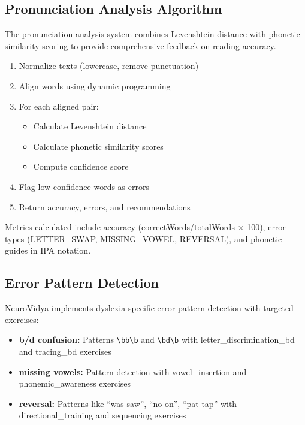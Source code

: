 \documentclass[journal]{IEEEtran}
\begin{document}
\subsection{Pronunciation Analysis Algorithm}

The pronunciation analysis system combines Levenshtein distance with phonetic similarity scoring to provide comprehensive feedback on reading accuracy.

\begin{enumerate}
    \item Normalize texts (lowercase, remove punctuation)
    \item Align words using dynamic programming
    \item For each aligned pair:
    \begin{itemize}
        \item Calculate Levenshtein distance
        \item Calculate phonetic similarity scores
        \item Compute confidence score
    \end{itemize}
    \item Flag low-confidence words as errors
    \item Return accuracy, errors, and recommendations
\end{enumerate}

Metrics calculated include accuracy (correctWords/totalWords $\times$ 100), error types (LETTER\_SWAP, MISSING\_VOWEL, REVERSAL), and phonetic guides in IPA notation.

\subsection{Error Pattern Detection}

NeuroVidya implements dyslexia-specific error pattern detection with targeted exercises:
\begin{itemize}
    \item \textbf{b/d confusion:} Patterns \texttt{\textbackslash bb\textbackslash b} and \texttt{\textbackslash bd\textbackslash b} with letter\_discrimination\_bd and tracing\_bd exercises
    \item \textbf{missing vowels:} Pattern detection with vowel\_insertion and phonemic\_awareness exercises
    \item \textbf{reversal:} Patterns like ``was saw'', ``no on'', ``pat tap'' with directional\_training and sequencing exercises
\end{itemize}
\end{document}
